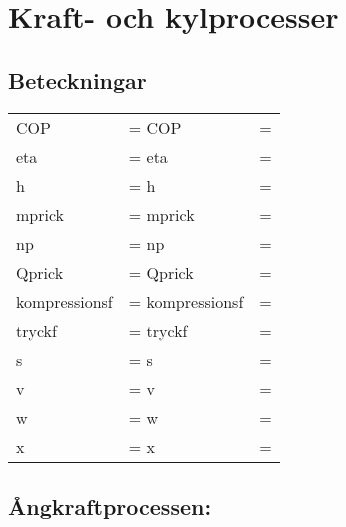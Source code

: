 \chapter{Kraft- och kylprocesser}
\section*{Beteckningar}
	\begin{tabularx}{\linewidth} { l
	>{\raggedright\arraybackslash\hsize=1.5\hsize\linewidth=\hsize}X
	>{\raggedright\arraybackslash\hsize=0.5\hsize\linewidth=\hsize}X}
	\acrshort{COP} & \acrlong{COP}\\
	\acrshort{eta} & \acrlong{eta}\\
	\acrshort{h} & \acrlong{h}\\
	\acrshort{mprick} & \acrlong{mprick}\\
	\acrshort{np} & \acrlong{np}\\
	\acrshort{Qprick} & \acrlong{Qprick}\\
	\acrshort{kompressionsf} & \acrlong{kompressionsf}\\
	\acrshort{tryckf} & \acrlong{tryckf}\\
	\acrshort{s} & \acrlong{s}\\
	\acrshort{v} & \acrlong{v}\\
	\acrshort{w} & \acrlong{w}\\
	\acrshort{x} & \acrlong{x}
\end{tabularx}
\section*{Ångkraftprocessen:}
